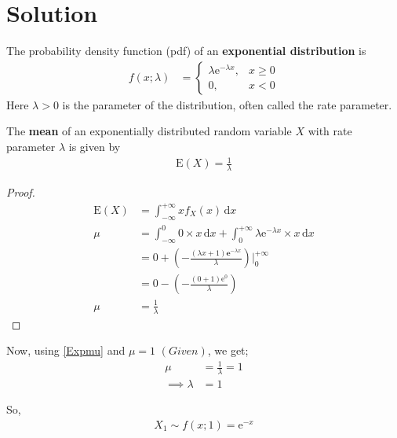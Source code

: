 \documentclass[twocolumn]{article}
\newtheorem{proof}[theorem]{Proof}
\providecommand{\brak}[1]{\ensuremath{\left(#1\right)}}
\begin{document}
\section*{Solution}
\begin{definition}
The probability density function (pdf) of an \textbf{ exponential distribution} is
\begin{align}
    f\brak{x;\lambda} &=
    \begin{cases}
    \lambda \mathrm{e}^{-\lambda x} , & x  \geq 0 \\
     0, &  x < 0
    \end{cases}
\end{align}
Here $\lambda > 0$ is the parameter of the distribution, often called the rate parameter.
\end{definition}
\begin{lemma}
The \textbf{mean} of an exponentially distributed random variable $X$ with rate parameter $\lambda$ is given by
\begin{align}
    \mathrm{E}\brak{X} =\frac{1}{\lambda}
\end{align}
\end{lemma}
\begin{proof}
\begin{align}
       \mathrm{E}\brak{X} &= \int_{-\infty}^{+\infty} xf_X\brak{x} \,\mathrm{d}x \\
       \mu &= \int_{-\infty}^{0} 0 \times x \, \mathrm{d}x + \int_{0}^{+\infty} \lambda\mathrm{e}^{-\lambda x} \times x \, \mathrm{d}x \\
       &= 0 + \brak{- \frac{\brak{\lambda x + 1 } \mathbf{e}^{-\lambda x}} {\lambda}}\Bigr|_{0}^{+\infty } \\
       &= 0 - \brak{- \frac{\brak{0+1}\mathrm{e}^{0} }{\lambda}} \\
     \mu  &= \frac{1}{\lambda} \label{Expmu}
\end{align}
\end{proof}
Now, using \eqref{Expmu} and $\mu = 1$ \brak{Given}, we get; 
 \begin{align}
    \mu &= \frac{1}{\lambda} = 1 \\
\implies    \lambda &= 1 \label{explambda}
\end{align}

So, \begin{align}
 X_1  \sim  f\brak{x;1} = \mathrm{e}^{-x} \label{FX1}
\end{align}
\end{document}
